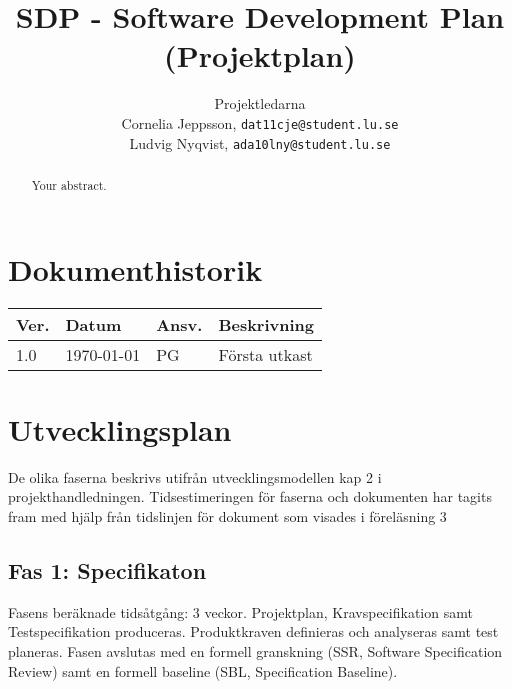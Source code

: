 \documentclass[a4paper]{article}
\title{SDP - Software Development Plan (Projektplan)}
\author{Projektledarna\\Cornelia Jeppsson, \texttt{dat11cje@student.lu.se}\\
Ludvig Nyqvist, \texttt{ada10lny@student.lu.se}}
\begin{document}
\maketitle
\thispagestyle{fancy}

\begin{abstract}
Your abstract.
\end{abstract}



\tableofcontents
\newpage

\section*{Dokumenthistorik}
\begin{tabular}{ l l l l }
Ver. & Datum & Ansv. & Beskrivning \\\hline
1.0 & \today & PG & Första utkast
\end{tabular}


\section{Utvecklingsplan}

De olika faserna beskrivs utifrån utvecklingsmodellen kap 2 i projekthandledningen\cite{projekthandledning}. Tidsestimeringen för faserna och dokumenten har tagits fram med hjälp från tidslinjen för dokument som visades i föreläsning 3\cite{dokumenttidslinje}
\begin{comment}

En utvecklingsplan som anger fasernas tidsbehov och händelser av betydelse (granskningar och baselines). I utvecklingsplanen beskrivs också eventuell anpassning av utvecklingsmodellen samt dokument till projektet (eng. tailoring)

Det ska finnas referenser till utvecklingsmodellen kap 2 i boken och beskrivning av eventuella anpassningar.
\end{comment}

\subsection{Fas 1: Specifikaton}
Fasens beräknade tidsåtgång: 3 veckor.\newline
Projektplan, Kravspecifikation samt Testspecifikation produceras. Produktkraven definieras och analyseras samt test planeras. Fasen avslutas med en formell granskning (SSR, Software Specification Review) samt en formell baseline (SBL, Specification Baseline).
\end{document}
